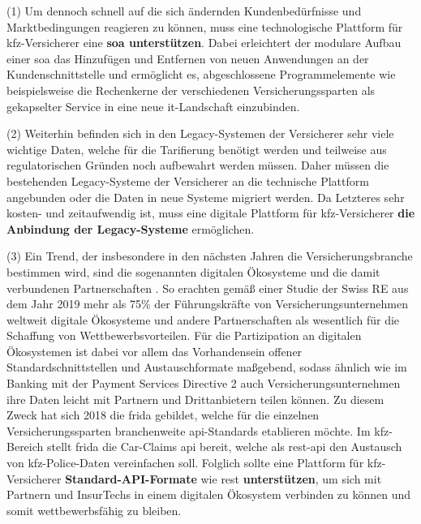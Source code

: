 
(1) Um dennoch schnell auf die sich ändernden Kundenbedürfnisse und Marktbedingungen reagieren zu können, muss eine technologische Plattform für \ac{kfz}-Versicherer eine \textbf{\ac{soa} unterstützen}. Dabei erleichtert der modulare Aufbau einer \ac{soa} das Hinzufügen und Entfernen von neuen Anwendungen an der Kundenschnittstelle \autocite[Vgl.][S. 392]{WARG2016} und ermöglicht es, abgeschlossene Programmelemente wie beispielsweise die Rechenkerne der verschiedenen Versicherungssparten als gekapselter Service in eine neue \ac{it}-Landschaft einzubinden. \autocite[Vgl.][S. 10f]{URLA2019}

(2) Weiterhin befinden sich in den Legacy-Systemen der Versicherer sehr viele wichtige Daten, welche für die Tarifierung benötigt werden und teilweise aus regulatorischen Gründen noch aufbewahrt werden müssen. Daher müssen die bestehenden Legacy-Systeme der Versicherer an die technische Plattform angebunden oder die Daten in neue Systeme migriert werden. Da Letzteres sehr kosten- und zeitaufwendig ist, muss eine digitale Plattform für \ac{kfz}-Versicherer \textbf{die Anbindung der Legacy-Systeme} ermöglichen. \autocite[Vgl.][S. 10-12]{GUNTER2020}

(3) Ein Trend, der insbesondere in den nächsten Jahren die Versicherungsbranche bestimmen wird, sind die sogenannten digitalen Ökosysteme und die damit verbundenen Partnerschaften \autocite[Vgl.][]{AVRAMAKIS2023}. So erachten gemäß einer Studie der Swiss RE aus dem Jahr 2019 mehr als 75\% der Führungskräfte von Versicherungsunternehmen weltweit digitale Ökosysteme und andere Partnerschaften als wesentlich für die Schaffung von Wettbewerbsvorteilen. \autocite[Vgl.][]{PAYNE2022} Für die Partizipation an digitalen Ökosystemen ist dabei vor allem das Vorhandensein offener Standardschnittstellen und Austauschformate maßgebend, sodass ähnlich wie im Banking mit der Payment Services Directive 2 auch Versicherungsunternehmen ihre Daten leicht mit Partnern und Drittanbietern teilen können. Zu diesem Zweck hat sich 2018 die \ac{frida} gebildet, welche für die einzelnen Versicherungssparten branchenweite \ac{api}-Standards etablieren möchte.\autocite[Vgl.][]{2021z} Im \ac{kfz}-Bereich stellt \ac{frida} die Car-Claims \ac{api} bereit, welche als \ac{rest}-\ac{api} den Austausch von \ac{kfz}-Police-Daten vereinfachen soll. Folglich sollte eine Plattform für \ac{kfz}-Versicherer \textbf{Standard-API-Formate} wie \ac{rest} \textbf{unterstützen}, um sich mit Partnern und InsurTechs in einem digitalen Ökosystem verbinden zu können und somit wettbewerbsfähig zu bleiben. \autocite[Vgl.][]{KRETZ2023}

